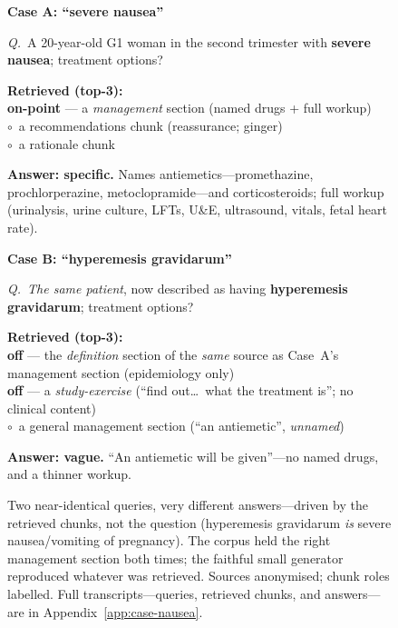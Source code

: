 \begin{figure}[H]
\footnotesize
\begin{minipage}[t]{0.475\columnwidth}
{\centering\colorbox{mamteal!15}{\textbf{Case A: ``severe nausea''}}\par}
\smallskip
\emph{Q.}~A 20-year-old G1 woman in the second trimester with \textbf{severe
nausea}; treatment options?

\smallskip
\textbf{Retrieved (top-3):}\\
\textcolor{mamteal}{\textbf{on-point}} --- a \emph{management} section
(named drugs + full workup)\\
\textcolor{black!45}{$\circ$}~a recommendations chunk (reassurance; ginger)\\
\textcolor{black!45}{$\circ$}~a rationale chunk

\smallskip
\textbf{Answer: specific.} Names antiemetics---promethazine,
prochlorperazine, metoclopramide---and corticosteroids; full workup
(urinalysis, urine culture, LFTs, U\&E, ultrasound, vitals, fetal heart rate).
\end{minipage}%
\hfill
\begin{minipage}[t]{0.475\columnwidth}
{\centering\colorbox{red!12}{\textbf{Case B: ``hyperemesis gravidarum''}}\par}
\smallskip
\emph{Q.}~\emph{The same patient}, now described as having
\textbf{hyperemesis gravidarum}; treatment options?

\smallskip
\textbf{Retrieved (top-3):}\\
\textcolor{red!65!black}{\textbf{off}} --- the \emph{definition} section of
the \emph{same} source as Case~A's management section (epidemiology only)\\
\textcolor{red!65!black}{\textbf{off}} --- a \emph{study-exercise}
(``find out\ldots\ what the treatment is''; no clinical content)\\
\textcolor{black!45}{$\circ$}~a general management section (``an antiemetic'',
\emph{unnamed})

\smallskip
\textbf{Answer: vague.} ``An antiemetic will be given''---no named drugs, and
a thinner workup.
\end{minipage}
\caption{Two near-identical queries, very different answers---driven by the
retrieved chunks, not the question (hyperemesis gravidarum \emph{is} severe
nausea/vomiting of pregnancy). The corpus held the right management section
both times; the faithful small generator reproduced whatever was retrieved.
Sources anonymised; chunk roles labelled. Full transcripts---queries,
retrieved chunks, and answers---are in Appendix~\ref{app:case-nausea}.}
\label{fig:case-nausea}
\end{figure}

